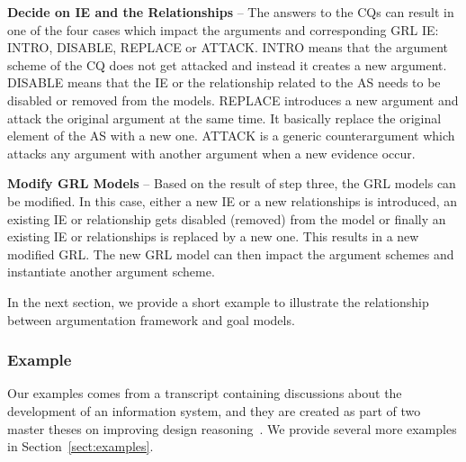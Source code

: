 \textbf{Decide on IE and the Relationships} -- The answers to the CQs can result in one of the four cases which impact the arguments and corresponding GRL IE: \textsf{INTRO}, \textsf{DISABLE}, \textsf{REPLACE} or \textsf{ATTACK}.  \textsf{INTRO} means that the argument scheme of the CQ does not get attacked and instead it creates a new argument. \textsf{DISABLE} means that the IE or the relationship related to the AS needs to be disabled or removed from the models. \textsf{REPLACE} introduces a new argument and attack the original argument at the same time. It basically replace the original element of the AS with a new one.  \textsf{ATTACK} is a generic counterargument which attacks any argument with another argument when a new evidence occur.  

\textbf{Modify GRL Models} -- Based on the result of step three, the GRL models can be modified. In this case, either a new IE or a new relationships is introduced, an existing IE or relationship gets disabled (removed) from the model or finally an existing IE or relationships is replaced by a new one. This results in a new modified GRL. The new GRL model can then impact the argument schemes and instantiate another argument scheme.   

In the next section, we provide a short example to illustrate the relationship between argumentation framework and goal models. 

\subsubsection*{Example} 
\label{sect:methodology-example}

Our examples comes from a transcript containing discussions about the development of an information system, and they are created as part of two master theses on improving design reasoning~\cite{masterthesis1,masterthesis2}. We provide several more examples in Section~\ref{sect:examples}.

